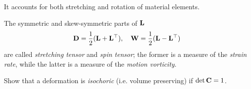 
It accounts for both stretching and rotation of material elements.


The symmetric and skew-symmetric parts of $\mathbf{L}$
\begin{equation}
	\mathbf{D}=\frac 12 (\mathbf{L}+\mathbf{L}^\top), \quad \mathbf{W}=\frac 12 (\mathbf{L}-\mathbf{L}^\top)
\end{equation}
are called \textit{stretching tensor} and \textit{spin tensor}; the former is a measure of the \textit{strain rate}, while the latter is a measure of the \textit{motion vorticity}.



\begin{exercise}
	Show that a deformation is  \emph{isochoric} (i.e. volume preserving) if $\det\mathbf{C}=1$.
\end{exercise}





